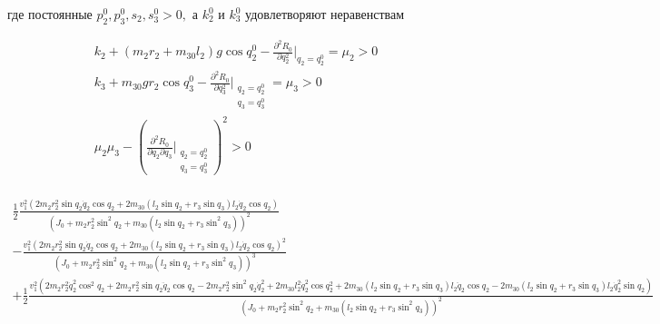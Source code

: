    где постоянные $p_2^0, p_3^0, s_2, s_3^0 > 0,$ а $k_2^0$ и $k_3^0$ удовлетворяют неравенствам 
   
   \begin{equation*}
   \begin{array}{l}
   \displaystyle k_2 + (m_2 r_2 + m_{30} l_2) g \cos q_2^0 - \frac{\partial^2 R_0}{\partial q_2^2} \bigg\rvert_{q_2 = q_2^0} = \mu_2 > 0 \\
   \displaystyle k_3 + m_{30} g r_2 \cos q_3^0 - \frac{\partial^2 R_0}{\partial q_3^2} \bigg\rvert_{\substack{q_2 = q_2^0 \\ q_3 = q_3^0}} = \mu_3 > 0 \\
   \displaystyle \mu_2 \mu_3 - \left( \frac{\partial^2 R_0}{\partial q_2 \partial q_3}  \bigg\rvert_{\substack{q_2 = q_2^0 \\ q_3 = q_3^0}}\right)^2 > 0 \\
   \end{array}
   \end{equation*}
   
   \begin{equation*}
   \begin{array}{l}
   \displaystyle \frac12 \frac{v_1^2 (2 m_2 r_2^2 \sin q_2 \dot q_2 \cos q_2 + 2 m_{30} (l_2 \sin q_2 + r_3 \sin q_3) l_2 \dot q_2 \cos q_2)}{(J_0 + m_2 r_2^2 \sin^2 q_2 + m_{30} (l_2 \sin q_2 + r_3 \sin^2 q_3))^2} \\
   \displaystyle - \frac{v_1^2 (2 m_2 r_2^2 \sin q_2 \dot q_2 \cos q_2 + 2 m_{30} (l_2 \sin q_2 + r_3 \sin q_3) l_2 \dot q_2 \cos q_2)^2}{(J_0 + m_2 r_2^2 \sin^2 q_2 + m_{30} (l_2 \sin q_2 + r_3 \sin^2 q_3))^3} \\
   \displaystyle + \frac12 \frac{v_1^2 (2 m_2 r_2^2 \dot q_2^2 \cos^2 q_2 + 2 m_2 r_2^2 \sin q_2 \ddot q_2 \cos q_2 - 2 m_2 r_2^2 \sin^2 q_2 \dot q_2^2 + 2 m_{30} l_2^2 \dot q_2^2 \cos q_2^2 + 2 m_{30} (l_2 \sin q_2 + r_3 \sin q_3) l_2 \ddot q_2  \cos q_2 - 2 m_{30} (l_2 \sin q_2 + r_3 \sin q_3) l_2 \dot q_2^2 \sin q_2)}{(J_0 + m_2 r_2^2 \sin^2 q_2 + m_{30} (l_2 \sin q_2 + r_3 \sin^2 q_3))^2}
   \end{array}
   \end{equation*}
   
